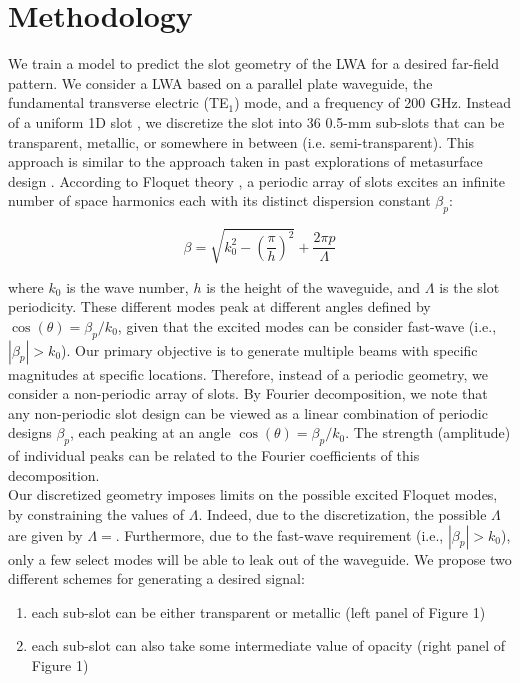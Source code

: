 \documentclass[11pt]{article}
\begin{document}
\section*{Methodology}

We train a model to predict the slot geometry of the LWA for a desired far-field pattern. We consider a LWA based on a parallel plate waveguide, the fundamental transverse electric (TE$_1$) mode, and a frequency of 200 GHz. Instead of a uniform 1D slot \cite{doi:10.1063/5.0033126}, we discretize the slot into 36 0.5-mm sub-slots that can be transparent, metallic, or somewhere in between (i.e. semi-transparent). This approach is similar to the approach taken in past explorations of metasurface design \cite{Liu:2022tg, Jafar-Zanjani:2018vy}. According to Floquet theory \cite{6556051}, a periodic array of slots excites an infinite number of space harmonics each with its distinct dispersion constant $\beta_p$:

\[\beta=\sqrt{k_0^2 - (\frac{\pi}{h})^2} +\frac{2\pi p}{\Lambda} \tag{1} \label{eq:special}\] 

\noindent where $k_0$ is the wave number, $h$ is the height of the waveguide, and $\Lambda$ is the slot periodicity. These different modes peak at different angles defined by $\cos(\theta)=\beta_p/k_0$, given that the excited modes can be consider fast-wave (i.e., $|\beta_p|>k_0$). Our primary objective is to generate multiple beams with specific magnitudes at specific locations. Therefore, instead of a periodic geometry, we consider a non-periodic array of slots. By Fourier decomposition, we note that any non-periodic slot design can be viewed as a linear combination of periodic designs $\beta_p$, each peaking at an angle $\cos(\theta)=\beta_p/k_0$. The strength (amplitude) of individual peaks can be related to the Fourier coefficients of this decomposition. \\

\noindent Our discretized geometry imposes limits on the possible excited Floquet modes, by constraining the values of $\Lambda$. Indeed, due to the discretization, the possible $\Lambda$ are given by $\Lambda=$. Furthermore, due to the fast-wave requirement (i.e., $|\beta_p|>k_0$), only a few select modes will be able to leak out of the waveguide. We propose two different schemes for generating a desired signal:

\begin{enumerate}
	\item each sub-slot can be either transparent or metallic (left panel of Figure 1)
	\item each sub-slot can also take some intermediate value of opacity (right panel of Figure 1)
\end{enumerate}  
\end{document}
